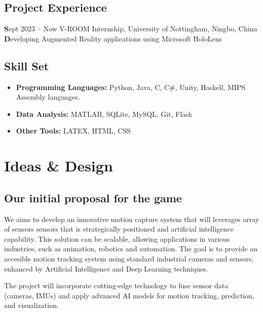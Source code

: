 \documentclass[a4paper,12pt]{article}
\begin{document}
    
    \subsection*{Project Experience}
    \textbf Sept 2023 – Now
    V-ROOM Internship, University of Nottingham, Ningbo, China\\
    \textbf Developing Augmented Reality applications using Microsoft HoloLens\\
    \subsection*{Skill Set}
    \begin{itemize}
        \item \textbf{Programming Languages:} Python, Java, C, C\#, Unity, Haskell, MIPS Assembly languages.
        \item \textbf{Data Analysis:} MATLAB, SQLite, MySQL, Git, Flask
        \item \textbf{Other Tools:} LATEX, HTML, CSS
    \end{itemize}
\newpage

\section{Ideas \& Design}
\subsection{Our initial proposal for the game}
We aims to develop an innovative motion capture system that will leverages array of sensors sensors that is strategically positioned and artificial intelligence capability. This solution can be scalable, allowing applications in various industries, such as animation, robotics and automation. The goal is to provide an accesible motion tracking system using standard industrial cameras and sensors, enhanced by Artificial Intelligence and Deep Learning techniques.

The project will incorporate cutting-edge technology to fuse sensor data (cameras, IMUs) and apply advanced AI models for motion tracking, prediction, and visualization.



\end{document}

